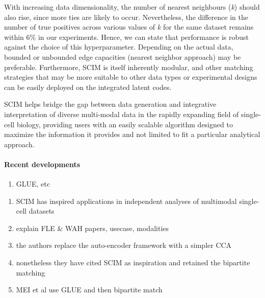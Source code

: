 With increasing data dimensionality, the number of nearest neighbours (\textit{k}) should also rise, since more ties are likely to occur.
Nevertheless, the difference in the number of true positives across various values of \textit{k} for the same dataset remains within 6\% in our experiments.
Hence, we can state that performance is robust against the choice of this hyperparameter.
Depending on the actual data, bounded or unbounded edge capacities (nearest neighbor approach) may be preferable.
Furthermore, SCIM is itself inherently modular, and other matching strategies that may be more suitable to other data types or experimental designs can be easily deployed on the integrated latent codes.

SCIM helps bridge the gap between data generation and integrative interpretation of diverse multi-modal data in the rapidly expanding field of single-cell biology, providing users with an easily scalable algorithm designed to maximize the information it provides and not limited to fit a particular analytical approach.

\paragraph{Recent developments}
\begin{enumerate}
  \item GLUE, etc
\end{enumerate}

\begin{enumerate}
  \item SCIM has inspired applications in independent analyses of multimodal single-cell datasets
  \item explain FLE \& WAH papers, usecase, modalities
  \item the authors replace the auto-encoder framework with a simpler CCA
  \item nonetheless they have cited SCIM as inspiration and retained the bipartite matching
  \item MEI et al use GLUE and then bipartite match
\end{enumerate}

